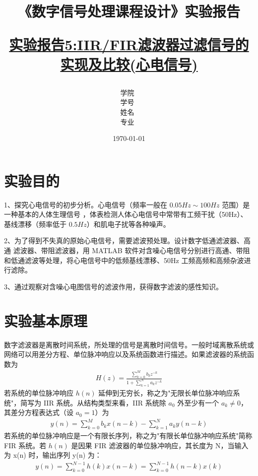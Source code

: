 \documentclass[12pt,hyperref,a4paper,UTF8]{ctexart}
\title{ 
        \vspace{1cm}
        \heiti \Huge \textbf{《数字信号处理课程设计》实验报告} \par
        \vspace{1cm} 
        \heiti \Large {\underline{实验报告5:IIR/FIR滤波器过滤信号的实现及比较(心电信号)}   } 
        \vspace{3cm}
    
    }
\author{
        \vspace{0.5cm}
        \kaishu\Large 学院\ \dlmu[9cm]{卓越学院} \\ %
        \vspace{0.5cm}
        \kaishu\Large 学号\ \dlmu[9cm]{23040447} \\ %
        \vspace{0.5cm}
        \kaishu\Large 姓名\ \dlmu[9cm]{陈文轩} \qquad  \\ %
        \vspace{0.5cm}
        \kaishu\Large 专业\ \dlmu[9cm]{智能硬件与系统(电子信息工程)} \qquad \\ %
    }
\date{\today} %
\begin{document}
\cover
\thispagestyle{empty} %







\newpage
\setcounter{page}{1} %

\section{实验目的}
1、探究心电信号的初步分析。心电信号（频率一般在 \(0.05Hz \sim 100Hz\) 范围）是一种基本的人体生理信号
，体表检测人体心电信号中常带有工频干扰（50Hz）、基线漂移（频率低于 \(0.5Hz\)）和肌电子扰等各种噪声。

2、为了得到不失真的原始心电信号，需要滤波预处理。设计数字低通滤波器、高通
滤波器、带阻滤波器，用 MATLAB 软件对含噪心电信号分别进行高通、带阻和低通滤波等处理，将心电信号中的低频基线漂移、50Hz 工频高频和高频杂波进行滤除。

3、通过观察对含噪心电图信号的滤波作用，获得数字滤波的感性知识。

\section{实验基本原理}

数字滤波器是离散时间系统，所处理的信号是离散时间信号。一般时域离散系统或网络可以用差分方程、单位脉冲响应以及系统函数进行描述。如果滤波器的系统函数为
\begin{align*}
H(z) = \frac{\sum_{k=0}^{M} b_k z^{-k}}{1 + \sum_{k=1}^{N} a_k z^{-k}} \tag{7-1}
\end{align*}
若系统的单位脉冲响应 \(h(n)\) 延伸到无穷长，称之为"无限长单位脉冲响应系统"，简写为 IIR 系统。从结构类型来看，IIR 系统除 \(a_0\) 外至少有一个 \(a_k \neq 0\)，其差分方程表达式（设 \(a_0 = 1\)）为
\begin{align*}
y(n) = \sum_{k=0}^{M} b_k x(n-k) - \sum_{k=1}^{N} a_k y(n-k) \tag{7-2}
\end{align*}
若系统的单位脉冲响应是一个有限长序列，称之为"有限长单位脉冲响应系统"简称FIR 系统。若 \(h(n)\) 是因果 FIR 滤波器的单位脉冲响应，其长度为 N，当输入为 x(n) 时，输出序列 y(n) 为：
\begin{align*}
y(n) = \sum_{k=0}^{N-1} h(k) x(n-k) = \sum_{k=0}^{N-1} h(n-k) x(k) \tag{7.3}
\end{align*}
\end{document}
